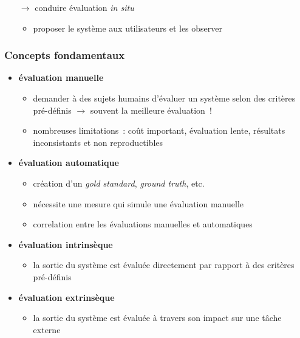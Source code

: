 \begin{frame}[allowframebreaks]
\begin{itemize}
    \item[$\to$] conduire évaluation \textit{in situ}
    \begin{itemize}
        \item proposer le système aux utilisateurs et les observer
    \end{itemize}

\end{itemize}

\end{frame}

\begin{frame}[allowframebreaks]
\frametitle{Concepts fondamentaux}

\begin{itemize} \itemsep0.8em
    \item \textbf{évaluation manuelle}
    \begin{itemize}
        \item demander à des sujets humains d'évaluer un système selon des 
              critères pré-définis $\to$ souvent la meilleure évaluation~!
        \item nombreuses limitations~: coût important, évaluation lente, 
              résultats inconsistants et non reproductibles
    \end{itemize}

    \item \textbf{évaluation automatique}
    \begin{itemize}
        \item création d'un \textit{gold standard}, \textit{ground truth}, etc.
        \item nécessite une mesure qui \og{}simule\fg{} une évaluation manuelle
        \item correlation entre les évaluations manuelles et automatiques
    \end{itemize}

    \framebreak

    \item \textbf{évaluation intrinsèque}
    \begin{itemize}
        \item la sortie du système est évaluée directement par rapport à des 
              critères pré-définis
    \end{itemize}

    \item \textbf{évaluation extrinsèque}
    \begin{itemize}
        \item la sortie du système est évaluée à travers son impact sur une 
              tâche externe
    \end{itemize}


\end{itemize}
\end{frame}
